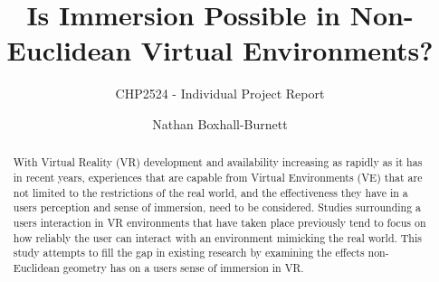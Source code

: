\documentclass[abstract=on,12pt]{scrreprt}
\title{Is Immersion Possible in Non-Euclidean Virtual Environments?}
\subtitle{CHP2524 - Individual Project Report}
\author{Nathan Boxhall-Burnett}
\begin{document}
	\maketitle


	\tableofcontents

	\begin{abstract}
		\thispagestyle{plain}






		With Virtual Reality (VR) development and availability increasing as rapidly as it has in recent years, experiences that are capable from Virtual Environments (VE) that are not limited to the restrictions of the real world, and the effectiveness they have in a users perception and sense of immersion, need to be considered.
		Studies surrounding a users interaction in VR environments that have taken place previously tend to focus on how reliably the user can interact with an environment mimicking the real world.
		This study attempts to fill the gap in existing research by examining the effects non-Euclidean geometry has on a users sense of immersion in VR.

	\end{abstract}

	\titleformat{\chapter}[hang]{\large\bfseries}{\thechapter}{1em}{\large}
\end{document}
